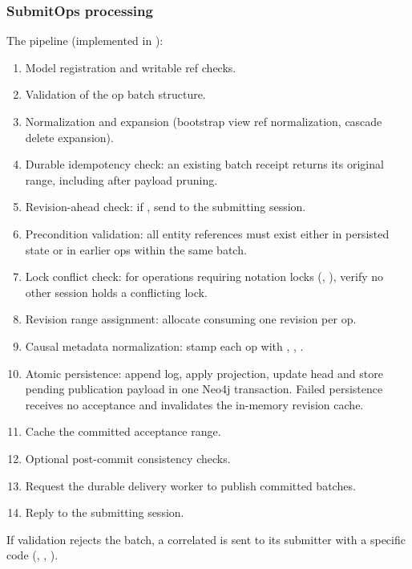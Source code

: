 \subsubsection{SubmitOps processing}

The  pipeline (implemented in ):

\begin{enumerate}
\item Model registration and writable ref checks.
\item Validation of the op batch structure.
\item Normalization and expansion (bootstrap view ref normalization,
  cascade delete expansion).
\item Durable idempotency check: an existing batch receipt returns its original
   range, including after payload pruning.
\item Revision-ahead check: if ,
  send  to the submitting session.
\item Precondition validation: all entity references must exist either in
  persisted state or in earlier ops within the same batch.
\item Lock conflict check: for operations requiring notation locks
  (, ),
  verify no other session holds a conflicting lock.
\item Revision range assignment: allocate  consuming one
  revision per op.
\item Causal metadata normalization: stamp each op with
  , , .
\item Atomic persistence: append log, apply projection, update head and store
  pending publication payload in one Neo4j transaction. Failed persistence
  receives no acceptance and invalidates the in-memory revision cache.
\item Cache the committed acceptance range.
\item Optional post-commit consistency checks.
\item Request the durable delivery worker to publish committed batches.
\item Reply  to the submitting session.
\end{enumerate}

If validation rejects the batch, a correlated  is sent to its submitter
with a specific code (, ,
).

